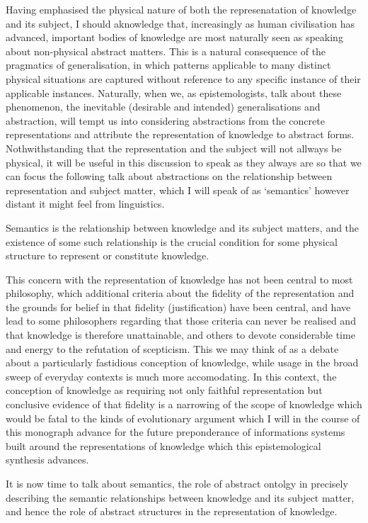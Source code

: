 Having emphasised the physical nature of both the represenatation of knowledge and its subject, I should aknowledge that, increasingly as human civilisation has advanced, important bodies of knowledge are most naturally seen as speaking about non-physical abstract matters.
This is a natural consequence of the pragmatics of generalisation, in which patterns applicable to many distinct physical situations are captured without reference to any specific instance of their applicable instances.
Naturally, when we, as epistemologists, talk about these phenomenon, the inevitable (desirable and intended) generalisations and abstraction, will tempt us into considering abstractions from the concrete representations and attribute the representation of knowledge to abstract forms.
Nothwithstanding that the representation and the subject will not allways be physical, it will be useful in this discussion to speak as they always are so that we can focus the following talk about abstractions on the relationship between representation and subject matter, which I will speak of as `semantics' however distant it might feel from linguistics.

Semantics is the relationship between knowledge and its subject matters, and the existence of some such relationship is the crucial condition for some physical structure to represent or constitute knowledge.

This concern with the representation of knowledge has not been central to most philosophy, which additional criteria about the fidelity of the representation and the grounds for belief in that fidelity (justification) have been central, and have lead to some philosophers regarding that those criteria can never be realised and that knowledge is therefore unattainable, and others to devote considerable time and energy to the refutation of scepticism.
This we may think of as a debate about a particularly fastidious conception of knowledge, while usage in the broad sweep of everyday contexts is much more accomodating.
In this context, the conception of knowledge as requiring not only faithful representation but conclusive evidence of that fidelity is a narrowing of the scope of knowledge which would be fatal to the kinds of evolutionary argument which I will in the course of this monograph advance for the future preponderance of informations systems built around the representations of knowledge which this epistemological synthesis advances.

It is now time to talk about semantics, the role of abstract ontolgy in precisely describing the semantic relationships between knowledge and its subject matter, and hence the role of abstract structures in the representation of knowledge.


